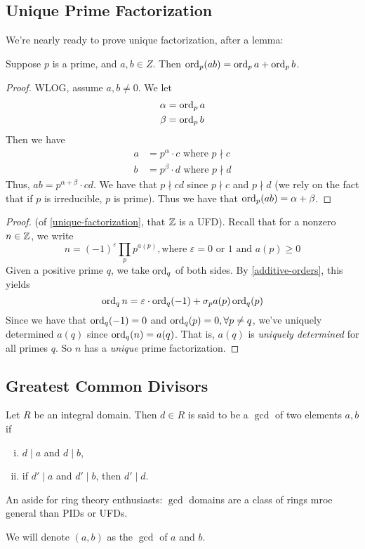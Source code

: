 \subsection{Unique Prime Factorization}
We're nearly ready to prove unique factorization, after a lemma:
\begin{lemma}\label{additive-orders}
    Suppose $p$ is a prime, and $a, b\in Z$. Then $\operatorname{ord}_p(ab) = \operatorname{ord}_p a + \operatorname{ord}_p b$.
\end{lemma}
\begin{proof}
    WLOG, assume $a, b\neq 0$. We let
    \begin{align*}
        \alpha & = \operatorname{ord}_p a \\
        \beta  & = \operatorname{ord}_p b
    \end{align*}
    Then we have
    \begin{align*}
        a & = p^\alpha\cdot c \text{ where }p\nmid c \\
        b & = p^\beta\cdot d \text{ where }p\nmid d
    \end{align*}
    Thus, $ab = p^{\alpha + \beta}\cdot cd$. We have that $p\nmid cd$ since $p\nmid c$ and $p\nmid d$ (we rely on the fact that if $p$ is irreducible, $p$ is prime). Thus we have that $\operatorname{ord}_p (ab) = \alpha + \beta$.
\end{proof}

\begin{proof}
    (of \cref{unique-factorization}, that $\mathbb Z$ is a UFD). Recall that for a nonzero $n\in \mathbb Z$, we write
    \[n = (-1)^\varepsilon \prod_{p}p^{a(p)}, \text{where }\varepsilon = 0\text{ or }1\text{ and }a(p)\geq 0\]
    Given a positive prime $q$, we take $\operatorname{ord}_q$ of both sides. By \cref{additive-orders}, this yields
    \[\operatorname{ord}_q n = \varepsilon\cdot \operatorname{ord}_q (-1) + \sigma_p a(p)\operatorname{ord}_q(p)\]
    Since we have that $\operatorname{ord}_q(-1) = 0$ and $\operatorname{ord}_q(p) = 0, \forall p\neq q$, we've uniquely determined $a(q)$ since $\operatorname{ord}_q(n) = a(q)$. That is, $a(q)$ is \emph{uniquely determined} for all primes $q$. So $n$ has a \emph{unique} prime factorization.
\end{proof}

\subsection{Greatest Common Divisors}
\begin{definition}
    Let $R$ be an integral domain. Then $d\in R$ is said to be a $\gcd$ of two elements $a, b$ if
    \begin{enumerate}[i)]
        \item $d\mid a$ and $d\mid b$,
        \item if $d'\mid a$ and $d'\mid b$, then $d'\mid d$.
    \end{enumerate}
\end{definition}
\begin{remark*}
    An aside for ring theory enthusiasts: $\gcd$ domains are a class of rings mroe general than PIDs or UFDs.
\end{remark*}
We will denote $(a, b)$ as the $\gcd$ of $a$ and $b$.

